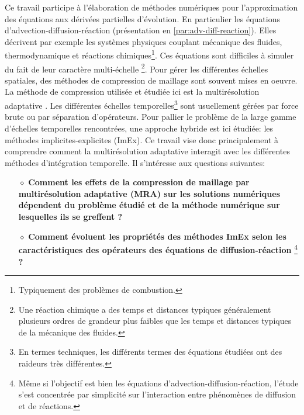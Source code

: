 Ce travail participe à l'élaboration de méthodes numériques pour l'approximation des équations aux dérivées partielles d'évolution.
En particulier les équations d'advection-diffusion-réaction (présentation en \ref{par:adv-diff-reaction}). Elles décrivent par exemple les systèmes physiques couplant
mécanique des fluides, thermodynamique et réactions chimiques\footnote{Typiquement des problèmes de combustion.}.
Ces équations sont difficiles à simuler du fait de leur caractère multi-échelle
\footnote{Une réaction chimique a des temps et distances typiques généralement plusieurs ordres de grandeur plus faibles que les temps et distances typiques de la mécanique des fluides.}.
Pour gérer les différentes échelles spatiales, des méthodes de compression de maillage sont souvent mises en oeuvre. 
La méthode de compression utilisée et étudiée ici est la multirésolution adaptative \cite{harten1994}.
Les différentes échelles temporelles\footnote{En termes techniques, les différents termes des équations étudiées ont des raideurs très différentes.}
sont usuellement gérées par force brute ou par séparation d'opérateurs. 
Pour pallier le problème de la large gamme d'échelles temporelles rencontrées, une approche hybride est ici étudiée: les méthodes implicites-explicites (ImEx).
Ce travail vise donc principalement à comprendre comment la multirésolution adaptative interagit avec les différentes méthodes d'intégration temporelle.
Il s'intéresse aux questions suivantes:
\begin{itemize}
\item[$\diamond$] \textbf{Comment les effets de la compression de maillage par multirésolution adaptative (MRA) sur les solutions numériques
dépendent du problème étudié et de la méthode numérique sur lesquelles ils se greffent ?}
\item[$\diamond$] \textbf{Comment évoluent les propriétés des méthodes ImEx selon les caractéristiques des opérateurs des équations de diffusion-réaction}
                \footnote{Même si l'objectif est bien les équations d'advection-diffusion-réaction, l'étude s'est concentrée par simplicité sur l'interaction entre phénomènes de diffusion et de réactions.}
                \textbf{ ?}
\end{itemize}